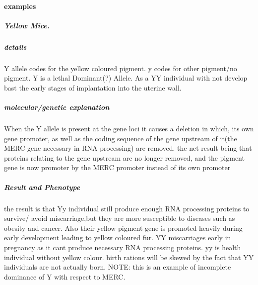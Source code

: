 \documentclass[]{article}
\let\oldparagraph\paragraph
\renewcommand{\paragraph}[1]{\oldparagraph{#1}\mbox{}}
\let\oldsubparagraph\subparagraph
\renewcommand{\subparagraph}[1]{\oldsubparagraph{#1}\mbox{}}
\begin{document}
\hypertarget{examples}{%
\paragraph{examples}\label{examples}}

\hypertarget{yellow-mice.}{%
\subparagraph{Yellow Mice.}\label{yellow-mice.}}

\hypertarget{details-4}{%
\subparagraph{details}\label{details-4}}

Y allele codes for the yellow coloured pigment. y codes for other
pigment/no pigment. Y is a lethal Dominant(?) Allele. As a YY individual
with not develop bast the early stages of implantation into the uterine
wall.

\hypertarget{moleculargenetic-explanation}{%
\subparagraph{molecular/genetic
explanation}\label{moleculargenetic-explanation}}

When the Y allele is present at the gene loci it causes a deletion in
which, its own gene promoter, as well as the coding sequence of the gene
upstream of it(the MERC gene necessary in RNA processing) are removed.
the net result being that proteins relating to the gene upstream are no
longer removed, and the pigment gene is now promoter by the MERC
promoter instead of its own promoter

\hypertarget{result-and-phenotype}{%
\subparagraph{Result and Phenotype}\label{result-and-phenotype}}

the result is that Yy individual still produce enough RNA processing
proteins to survive/ avoid miscarriage,but they are more susceptible to
diseases such as obesity and cancer. Also their yellow pigment gene is
promoted heavily during early development leading to yellow coloured
fur. YY miscarriages early in pregnancy as it cant produce necessary RNA
processing proteins. yy is health individual without yellow colour.
birth rations will be skewed by the fact that YY individuals are not
actually born. NOTE: this is an example of incomplete dominance of Y
with respect to MERC.
\end{document}
